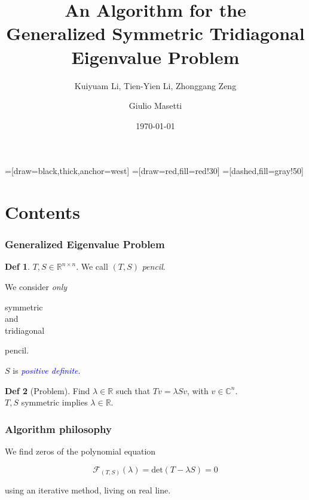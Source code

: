 \documentclass{beamer}
\title{An Algorithm for the \\
Generalized Symmetric Tridiagonal \\
Eigenvalue Problem}
\subtitle{Kuiyuam Li, Tien-Yien Li, Zhonggang Zeng}
\author{Giulio Masetti}
\institute{Universit\`a di Pisa\\
Corso Metodi di Approssimazione 2012-2013
}
\date{\today}
\newcommand{\R}{\mathbb{R}}
\newcommand{\C}{\mathbb{C}}
\newcommand{\effe}[2]{\mathcal{F}_{#1}(#2)}
\newcommand{\deter}[1]{\mathrm{det}(#1)}
\newcommand{\tc}{ $ such that $ }
\theoremstyle{definition} \newtheorem{de}{Def}
\theoremstyle{remark} \newtheorem{os}[de]{Oss}
\theoremstyle{plain} \newtheorem{te}[de]{Teo}
\theoremstyle{plain} \newtheorem{co}[de]{Cor}
\theoremstyle{plain} \newtheorem{pr}[de]{Prop}
\theoremstyle{plain} \newtheorem{lem}[de]{Lemm}
\theoremstyle{remark} \newtheorem{rem}[de]{Remark}
\begin{document}
\long{} 

=[draw=black,thick,anchor=west]
=[draw=red,fill=red!30]
=[dashed,fill=gray!50]

\newenvironment{fminipage}%
{\begin{Sbox}\begin{minipage}}%
{\end{minipage}
\end{Sbox}
\fbox{\TheSbox}}

\begin{frame}
  \titlepage
\end{frame}


\section{Contents}

\begin{frame} 
\frametitle{Generalized Eigenvalue Problem}  

\begin{de}
  $T,S\in\R^{n\times n}$. We call $(T,S)$ \emph{pencil}.
\end{de}

We consider \emph{only} \begin{fminipage}{0.8in} symmetric \\ and \\ 
tridiagonal\end{fminipage} pencil.

\pause

$S$ is \textcolor{blue}{\emph{positive definite}}.

\pause

\begin{de}[Problem]
  Find $\lambda\in\R \tc T v = \lambda S v$, with $v\in\C^n$. \\
  $T,S$ symmetric implies $\lambda\in\R$.
\end{de}
\end{frame}

\begin{frame}
\frametitle{Algorithm philosophy}

We find zeros of the polynomial equation

\begin{equation*}
  \effe{(T,S)}{\lambda} = \deter{T-\lambda S} = 0
\end{equation*}

using an iterative method, living on real line.
\end{frame}
\end{document}
